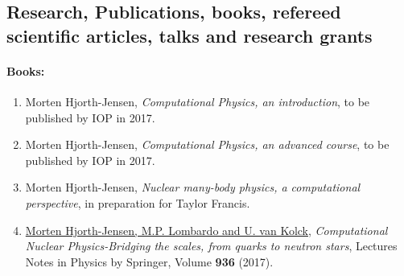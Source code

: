 \documentclass[a4wide,10pt]{article}
\begin{document}
\subsection*{Research, Publications, books, refereed scientific articles, talks and research grants}

\paragraph{Books:}
\begin{enumerate}
\item Morten Hjorth-Jensen, \emph{Computational Physics, an introduction}, to be published by IOP in 2017.

\item Morten Hjorth-Jensen, \emph{Computational Physics, an advanced course}, to be published by IOP in 2017.

\item Morten Hjorth-Jensen, \emph{Nuclear many-body physics, a computational perspective}, in preparation for Taylor Francis.

\item \href{{http://www.springer.com/us/book/9783319533353}}{Morten Hjorth-Jensen, M.P. Lombardo and U. van Kolck}, \emph{Computational Nuclear Physics-Bridging the scales, from quarks to neutron stars}, Lectures Notes in Physics by Springer, Volume \textbf{936} (2017).
\end{enumerate}

\end{document}

